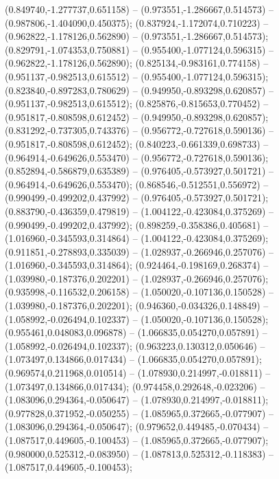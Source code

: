  (0.849740,-1.277737,0.651158) -- (0.973551,-1.286667,0.514573) -- (0.987806,-1.404090,0.450375);
 (0.837924,-1.172074,0.710223) -- (0.962822,-1.178126,0.562890) -- (0.973551,-1.286667,0.514573);
 (0.829791,-1.074353,0.750881) -- (0.955400,-1.077124,0.596315) -- (0.962822,-1.178126,0.562890);
 (0.825134,-0.983161,0.774158) -- (0.951137,-0.982513,0.615512) -- (0.955400,-1.077124,0.596315);
 (0.823840,-0.897283,0.780629) -- (0.949950,-0.893298,0.620857) -- (0.951137,-0.982513,0.615512);
 (0.825876,-0.815653,0.770452) -- (0.951817,-0.808598,0.612452) -- (0.949950,-0.893298,0.620857);
 (0.831292,-0.737305,0.743376) -- (0.956772,-0.727618,0.590136) -- (0.951817,-0.808598,0.612452);
 (0.840223,-0.661339,0.698733) -- (0.964914,-0.649626,0.553470) -- (0.956772,-0.727618,0.590136);
 (0.852894,-0.586879,0.635389) -- (0.976405,-0.573927,0.501721) -- (0.964914,-0.649626,0.553470);
 (0.868546,-0.512551,0.556972) -- (0.990499,-0.499202,0.437992) -- (0.976405,-0.573927,0.501721);
 (0.883790,-0.436359,0.479819) -- (1.004122,-0.423084,0.375269) -- (0.990499,-0.499202,0.437992);
 (0.898259,-0.358386,0.405681) -- (1.016960,-0.345593,0.314864) -- (1.004122,-0.423084,0.375269);
 (0.911851,-0.278893,0.335039) -- (1.028937,-0.266946,0.257076) -- (1.016960,-0.345593,0.314864);
 (0.924464,-0.198169,0.268374) -- (1.039980,-0.187376,0.202201) -- (1.028937,-0.266946,0.257076);
 (0.935998,-0.116532,0.206158) -- (1.050020,-0.107136,0.150528) -- (1.039980,-0.187376,0.202201);
 (0.946360,-0.034326,0.148849) -- (1.058992,-0.026494,0.102337) -- (1.050020,-0.107136,0.150528);
 (0.955461,0.048083,0.096878) -- (1.066835,0.054270,0.057891) -- (1.058992,-0.026494,0.102337);
 (0.963223,0.130312,0.050646) -- (1.073497,0.134866,0.017434) -- (1.066835,0.054270,0.057891);
 (0.969574,0.211968,0.010514) -- (1.078930,0.214997,-0.018811) -- (1.073497,0.134866,0.017434);
 (0.974458,0.292648,-0.023206) -- (1.083096,0.294364,-0.050647) -- (1.078930,0.214997,-0.018811);
 (0.977828,0.371952,-0.050255) -- (1.085965,0.372665,-0.077907) -- (1.083096,0.294364,-0.050647);
 (0.979652,0.449485,-0.070434) -- (1.087517,0.449605,-0.100453) -- (1.085965,0.372665,-0.077907);
 (0.980000,0.525312,-0.083950) -- (1.087813,0.525312,-0.118383) -- (1.087517,0.449605,-0.100453);
